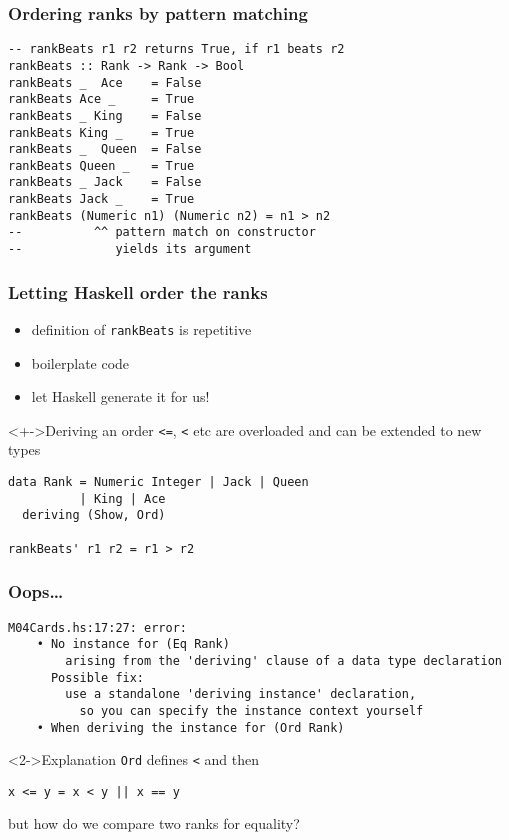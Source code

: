 \documentclass{beamer}
\begin{document}
\begin{frame}[fragile]
  \frametitle{Ordering ranks by pattern matching}
\begin{verbatim}
-- rankBeats r1 r2 returns True, if r1 beats r2
rankBeats :: Rank -> Rank -> Bool
rankBeats _  Ace    = False
rankBeats Ace _     = True
rankBeats _ King    = False
rankBeats King _    = True
rankBeats _  Queen  = False
rankBeats Queen _   = True
rankBeats _ Jack    = False
rankBeats Jack _    = True
rankBeats (Numeric n1) (Numeric n2) = n1 > n2
--          ^^ pattern match on constructor
--             yields its argument
\end{verbatim}
\end{frame}

\begin{frame}[fragile]
  \frametitle{Letting Haskell order the ranks}
  \begin{itemize}
  \item definition of \texttt{rankBeats} is repetitive
  \item boilerplate code
  \item let Haskell generate it for us!
  \end{itemize}
  \begin{block}<+->{Deriving an order}
    \texttt{<=}, \texttt{<} etc are overloaded and can be extended to
    new types
\begin{verbatim}
data Rank = Numeric Integer | Jack | Queen
          | King | Ace
  deriving (Show, Ord)

rankBeats' r1 r2 = r1 > r2
\end{verbatim}
  \end{block}
\end{frame}

\begin{frame}[fragile]
  \frametitle{Oops\dots}
\begin{verbatim}
M04Cards.hs:17:27: error:
    • No instance for (Eq Rank)
        arising from the 'deriving' clause of a data type declaration
      Possible fix:
        use a standalone 'deriving instance' declaration,
          so you can specify the instance context yourself
    • When deriving the instance for (Ord Rank)
\end{verbatim}
  \begin{block}<2->{Explanation}
    \texttt{Ord} defines \texttt{<} and then
\begin{verbatim}
x <= y = x < y || x == y
\end{verbatim}
    but how do we compare two ranks for equality?
  \end{block}
\end{frame}
\end{document}
